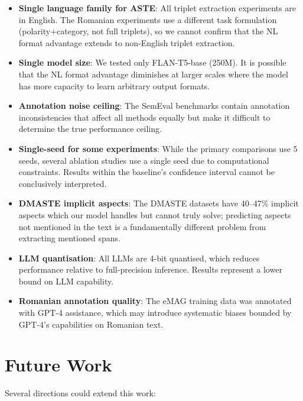 \documentclass[12pt,a4paper]{report}
\begin{document}
\begin{itemize}
    \item \textbf{Single language family for ASTE}: All triplet extraction experiments are in English. The Romanian experiments use a different task formulation (polarity+category, not full triplets), so we cannot confirm that the NL format advantage extends to non-English triplet extraction.
    
    \item \textbf{Single model size}: We tested only FLAN-T5-base (250M). It is possible that the NL format advantage diminishes at larger scales where the model has more capacity to learn arbitrary output formats.
    
    \item \textbf{Annotation noise ceiling}: The SemEval benchmarks contain annotation inconsistencies that affect all methods equally but make it difficult to determine the true performance ceiling.
    
    \item \textbf{Single-seed for some experiments}: While the primary comparisons use 5 seeds, several ablation studies use a single seed due to computational constraints. Results within the baseline's confidence interval cannot be conclusively interpreted.
    
    \item \textbf{DMASTE implicit aspects}: The DMASTE datasets have 40--47\% implicit aspects which our model handles but cannot truly solve; predicting aspects not mentioned in the text is a fundamentally different problem from extracting mentioned spans.
    
    \item \textbf{LLM quantisation}: All LLMs are 4-bit quantised, which reduces performance relative to full-precision inference. Results represent a lower bound on LLM capability.
    
    \item \textbf{Romanian annotation quality}: The eMAG training data was annotated with GPT-4 assistance, which may introduce systematic biases bounded by GPT-4's capabilities on Romanian text.
\end{itemize}

\section{Future Work}

Several directions could extend this work:
\end{document}
